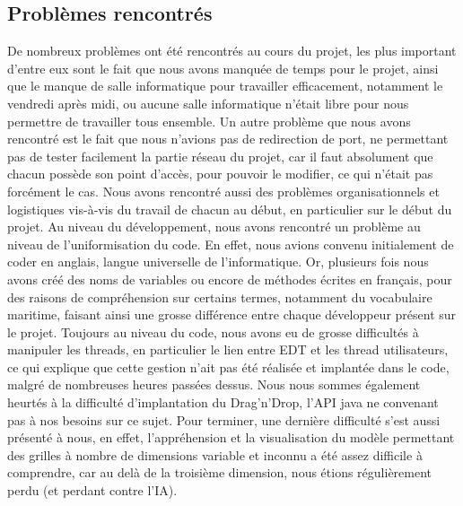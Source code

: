 \subsection{Problèmes rencontrés}
	De nombreux problèmes ont été rencontrés au cours du projet, les plus important d'entre eux sont le fait que nous avons manquée de temps pour le projet, ainsi que le manque de salle informatique pour travailler efficacement, notamment le vendredi après midi, ou aucune salle informatique n'était libre pour nous permettre de travailler tous ensemble.\newline
	Un autre problème que nous avons rencontré est le fait que nous n'avions pas de redirection de port, ne permettant pas de tester facilement la partie réseau du projet, car il faut absolument que chacun possède son point d'accès, pour pouvoir le modifier, ce qui n'était pas forcément le cas.\newline
	Nous avons rencontré aussi des problèmes organisationnels et logistiques vis-à-vis du travail de chacun au début, en particulier sur le début du projet.\newline
	Au niveau du développement, nous avons rencontré un problème au niveau de l'uniformisation du code. En effet, nous avions convenu initialement de coder en anglais, langue universelle de l'informatique. Or, plusieurs fois nous avons créé des noms de variables ou encore de méthodes écrites en français, pour des raisons de compréhension sur certains termes, notamment du vocabulaire maritime, faisant ainsi une grosse différence entre chaque développeur présent sur le projet.\newline
	Toujours au niveau du code, nous avons eu de grosse difficultés à manipuler les threads, en particulier le lien entre EDT et les thread utilisateurs, ce qui explique que cette gestion n'ait pas été réalisée et implantée dans le code, malgré de nombreuses heures passées dessus.\newline
	Nous nous sommes également heurtés à la difficulté d'implantation du Drag'n'Drop, l'API java ne convenant pas à nos besoins sur ce sujet.\newline
	Pour terminer, une dernière difficulté s'est aussi présenté à nous, en effet, l'appréhension et la visualisation du modèle permettant des grilles à nombre de dimensions variable et inconnu a été assez difficile à comprendre, car au delà de la troisième dimension, nous étions régulièrement perdu (et perdant contre l'IA).

